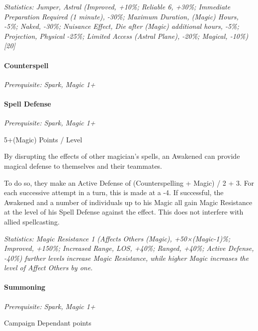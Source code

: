 \begin{multicols}{3}
	\textit{\textcolor{OliveGreen}{Statistics: Jumper, Astral (Improved, +10\%; Reliable 6, +30\%; Immediate Preparation Required (1 minute), -30\%; Maximum Duration, (Magic) Hours, -5\%; Naked, -30\%; Nuisance Effect, Die after (Magic) additional hours, -5\%; Projection, Physical -25\%;  Limited Access (Astral Plane), -20\%; Magical, -10\%) [20]}}
	
	\paragraph{Counterspell}\label{counterspell}
	\textit{Prerequisite: Spark, Magic 1+}
	\begin{flushright}
		
	\end{flushright}

	
	

	
	\paragraph{Spell Defense}\label{spell_defense}
	\textit{Prerequisite: Spark, Magic 1+}
	\begin{flushright}
		5+(Magic) Points / Level
	\end{flushright}
	
	By disrupting the effects of other magician's spells, an Awakened can provide magical defense to themselves and their teammates.
	
	To do so, they make an Active Defense of (Counterspelling + Magic) / 2 + 3. For each successive attempt in a turn, this is made at a -4. If successful, the Awakened and a number of individuals up to his Magic all gain Magic Resistance at the level of his Spell Defense against the effect. This does not interfere with allied spellcasting.
	
	\textit{\textcolor{OliveGreen}{Statistics: Magic Resistance 1 (Affects Others (Magic), +50×(Magic-1)\%; Improved, +150\%; Increased Range, LOS, +40\%; Ranged, +40\%; Active Defense, -40\%) further levels increase Magic Resistance, while higher Magic increases the level of Affect Others by one.}}
	
	\paragraph{Summoning}\label{summoning}
	\textit{Prerequisite: Spark, Magic 1+}
	\begin{flushright}
		Campaign Dependant points
	\end{flushright}
	

\end{multicols}
